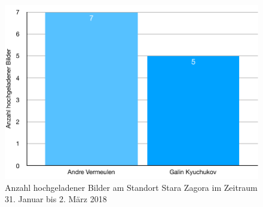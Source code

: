 \begin{figure}[h]
  \centering
  \includegraphics[keepaspectratio, width=\textwidth]{data/usage_bg}
  \caption{Anzahl hochgeladener Bilder am Standort Stara Zagora im Zeitraum 31. Januar bis 2. März 2018}
  \label{fig:usagebg}
\end{figure}
